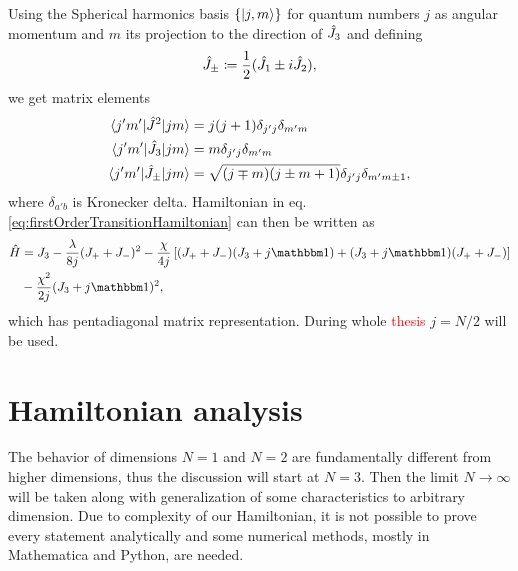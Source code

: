 Using the Spherical harmonics basis $\{\ket{j,m}\}$ for quantum numbers $j$ as angular momentum and $m$ its projection to the direction of $\hat{J}_3$ and defining
\begin{equation}
    \hat{J}_\pm\coloneqq\frac{1}{2}(\hat{J}_1\pm i\hat{J}_2),
\end{equation}
we get matrix elements
\begin{align}
    \braket{j'm'|\hat{J}^2|jm} &= j(j+1)\delta_{j'j}\delta_{m'm}\\
    \braket{j'm'|\hat{J}_3|jm} &= m \delta_{j'j}\delta_{m'm}\\
    \braket{j'm'|\hat{J}_\pm|jm} &= \sqrt{(j\mp m)(j\pm m+1)}\delta_{j'j}\delta_{m'm\pm 1},
\end{align}
where $\delta_{a'b}$ is Kronecker delta. Hamiltonian in eq. \ref{eq:firstOrderTransitionHamiltonian} can then be written as
\begin{equation}
\begin{split}
        \HH &= J_3-\frac{\lambda}{8j}(J_++J_-)^2-\frac{\chi}{4j}\left[(J_++J_-)(J_3+j\Id)+(J_3+j\Id)(J_++J_-)\right]\\
        &-\frac{\chi^2}{2j}(J_3+j\Id)^2,
\end{split}
\end{equation}
which has pentadiagonal matrix representation. During whole \textcolor{red}{thesis} $j=N/2$ will be used. 

\section{Hamiltonian analysis}
The behavior of dimensions $N=1$ and $N=2$ are fundamentally different from higher dimensions, thus the discussion will start at $N=3$. Then the limit $N\rightarrow\infty$ will be taken along with generalization of some characteristics to arbitrary dimension. Due to complexity of our Hamiltonian, it is not possible to prove every statement analytically and some numerical methods, mostly in Mathematica and Python, are needed.




